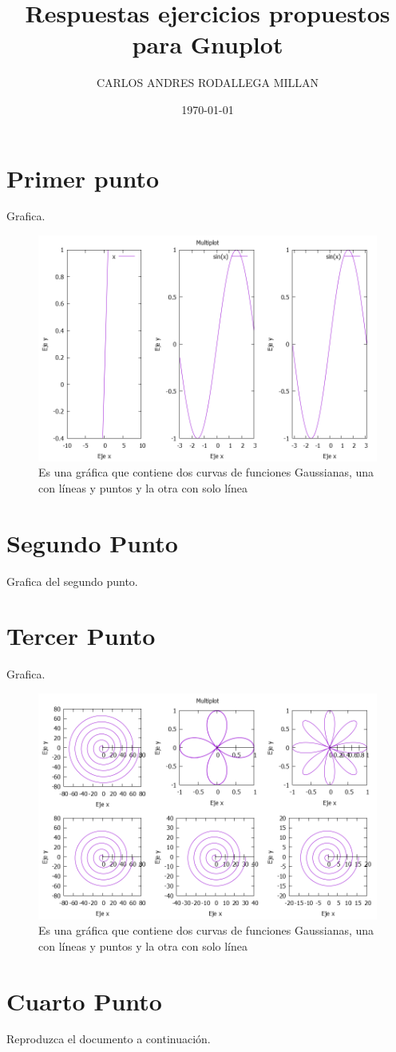 \documentclass[onecolumn]{article} %
\title{Respuestas ejercicios propuestos para Gnuplot}
\author{CARLOS ANDRES RODALLEGA MILLAN}
\date{\today}
\begin{document}
\maketitle 
\section{Primer punto} 
Grafica.
\begin{figure}[h!]%
	\centering %
	\includegraphics[scale=0.4]{Grafica_Tarea1_1.png}
	\caption{\label{fig_exp}Es una gráfica que contiene dos curvas de funciones Gaussianas, una con líneas y puntos y 		la otra con solo línea} %
\end{figure}
\section{Segundo Punto} 
Grafica del segundo punto.


\section{Tercer Punto}
Grafica.
\begin{figure}[h!]%
	\centering %
	\includegraphics[scale=0.4]{grafica3.png}
	\caption{\label{fig_exp}Es una gráfica que contiene dos curvas de funciones Gaussianas, una con líneas y puntos y 		la otra con solo línea} %
\end{figure}
\section{Cuarto Punto}
Reproduzca el documento a continuación.
\end{document}
